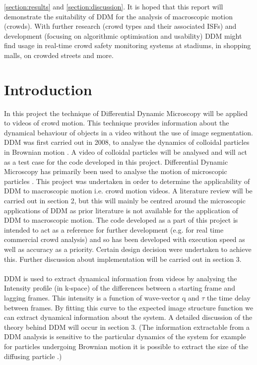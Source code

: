 \documentclass[11pt]{article}
\begin{document}
\ref{section:results} and \ref{section:discussion}. It is hoped that this report will demonstrate the suitability of DDM for the analysis of macroscopic motion (crowds). With further research (crowd types and their associated ISFs) and development (focusing on algorithmic optimisation and usability) DDM might find usage in real-time crowd safety monitoring systems at stadiums, in shopping malls, on crowded streets and more.

\clearpage
\tableofcontents

\clearpage
\section{Introduction}
In this project the technique of Differential Dynamic Microscopy will be applied to videos of crowd motion. This technique provides information about the dynamical behaviour of objects in a video without the use of image segmentation. DDM was first carried out in 2008, to analyse the dynamics of colloidal particles in Brownian motion \cite{ddm0}. A video of colloidal particles will be analysed and will act as a test case for the code developed in this project. Differential Dynamic Microscopy has primarily been used to analyse the motion of microscopic particles \cite{ddm1} \cite{ddm2}. This project was undertaken in order to determine the applicability of DDM to macroscopic motion i.e. crowd motion videos. A literature review will be carried out in section 2, but this will mainly be centred around the microscopic applications of DDM as prior literature is not available for the application of DDM to macroscopic motion. The code developed as a part of this project is intended to act as a reference for further development (e.g. for real time commercial crowd analysis) and so has been developed with execution speed as well as accuracy as a priority. Certain design decision were undertaken to achieve this. Further discussion about implementation will be carried out in section 3.
\\\\
DDM is used to extract dynamical information from videos by analysing the Intensity profile (in k-space) of the differences between a starting frame and lagging frames. This intensity is a function of wave-vector q and $\tau$ the time delay between frames. By fitting this curve to the expected image structure function we can extract dynamical information about the system. A detailed discussion of the theory behind DDM will occur in section 3. (The information extractable from a DDM analysis is sensitive to the particular dynamics of the system for example for particles undergoing Brownian motion it is possible to extract the size of the diffusing particle \cite{ddm1}.)
\end{document}
